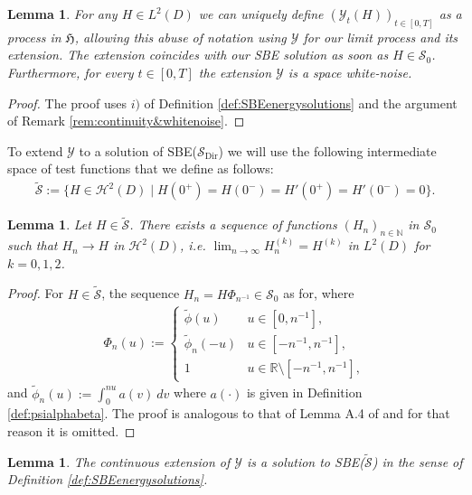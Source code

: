 \documentclass[a4paper, reqno, 12pt]{amsart}
\theoremstyle{plain}
\newtheorem{lemma}[definition]{Lemma}
\theoremstyle{definition}
\newcommand{\R}{\mathbb{R}}
\newcommand{\N}{\mathbb{N}}
\newcommand{\Sdir}{\mathcal{S}_{\text{Dir}}}
\begin{document}
\begin{lemma}\label{lem:L2extension}
    For any $H\in L^2(D)$ we can uniquely define $(\mathcal Y_t(H))_{t\in[0,T]}$ as a process in $\mathfrak H$,   allowing this abuse of notation using $\mathcal Y$ for our limit process and its extension. The extension coincides with our SBE solution as soon as $H\in\mathcal S_0$. Furthermore, for every $t\in[0,T]$ the extension $\mathcal Y$ is a space white-noise. 
\end{lemma}
\begin{proof}
    The proof uses $i)$ of Definition \ref{def:SBEenergysolutions} and the argument of Remark \ref{rem:continuity&whitenoise}. 
\end{proof}
To extend $\mathcal Y$ to a solution of SBE($\Sdir$) we will use the following intermediate space of test functions that we define as follows: 
    \begin{align*}
        \tilde{\mathcal S}:= \big\{H\in \mathcal H^2(D) \mid H(0^+) = H(0^-) = H'(0^+)  = H'(0^-) = 0 \big\}.
    \end{align*}



\begin{lemma} \label{lem:H2approx}
  Let $H\in\tilde{\mathcal{S}}$. There exists a sequence of functions $(H_n)_{n\in\N}$ in $\mathcal S_0$ such that $H_n\to H$ in $\mathcal H^2(D)$, i.e. $\lim_{n\to\infty} H_n^{(k)} = H^{(k)}$ in $L^2(D)$ for $k=0,1,2$. 
\end{lemma}
\begin{proof}
For  $H\in \tilde{\mathcal S}$, the sequence $H_n = H\Phi_{n^{-1}}\in \mathcal S_{0}$ as for, where 
\begin{align*}
    \Phi_{n}(u):= \left\{ \begin{array}{ll}
    \tilde \phi(u) & u\in[0,n^{-1}], \\
    \tilde{\phi}_n(-u)  & u\in[-n^{-1},n^{-1}], \\
    1 & u\in\R\setminus [-n^{-1},n^{-1}],
    \end{array} \right.
\end{align*}
and  $\tilde{\phi}_{n}(u):= \int_0^{nu}a(v)\ dv$ where $a(\cdot)$ is given in  Definition \ref{def:psialphabeta}. The proof  is analogous to that of Lemma A.4 of \cite{BGJS22} and for that reason it is omitted.
\end{proof}

\begin{lemma} \label{lem:tildeSextension}
    The continuous extension of $\mathcal Y$ is a solution to SBE($\tilde{\mathcal S}$) in the sense of Definition \ref{def:SBEenergysolutions}.
\end{lemma}
\end{document}
